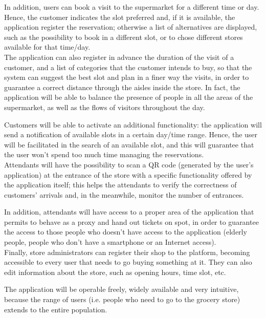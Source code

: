 \documentclass[table, 12pt]{article}
\begin{document}
\begin{flushleft}
    In addition, users can book a visit to the supermarket for a different time or day. Hence, the customer indicates the slot preferred and, if it is available, the application register the reservation; otherwise a list of alternatives are displayed, such as the possibility to book in a different slot, or to chose different stores available for that time/day.\\

    The application can also register in advance the duration of the visit of a customer, and a list of categories that the customer intends to buy, so that the system can suggest the best slot and plan in a finer way the visits, in order to guarantee a correct distance through the aisles inside the store. In fact, the application will be able to balance the presence of people in all the areas of the supermarket, as well as the flows of visitors throughout the day.

    Customers will be able to activate an additional functionality: the application will send a notification of available slots in a certain day/time range. Hence, the user will be facilitated in the search of an available slot, and this will guarantee that the user won't spend too much time managing the reservations.\\

    Attendants will have the possibility to scan a QR code (generated by the user's application) at the entrance of the store with a specific functionality offered by the application itself; this helps the attendants to verify the correctness of customers' arrivals and, in the meanwhile, monitor the number of entrances.

    In addition, attendants will have access to a proper area of the application that permits to behave as a proxy and hand out tickets on spot, in order to guarantee the access to those people who doesn't have access to the application (elderly people, people who don't have a smartphone or an Internet access).\\

    Finally, store administrators can register their shop to the platform, becoming accessible to every user that needs to go buying something at it. They can also edit information about the store, such as opening hours, time slot, etc.

    The application will be operable freely, widely available and very intuitive, because the range of users (i.e. people who need to go to the grocery store) extends to the entire population.


\end{flushleft}
\end{document}
